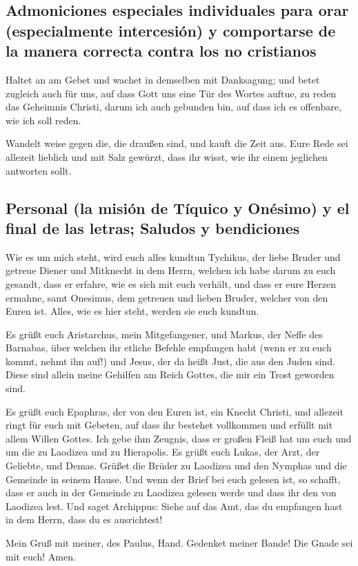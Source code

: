 \hypertarget{admoniciones-especiales-individuales-para-orar-especialmente-intercesiuxf3n-y-comportarse-de-la-manera-correcta-contra-los-no-cristianos}{%
\subsection{Admoniciones especiales individuales para orar
(especialmente intercesión) y comportarse de la manera correcta contra
los no
cristianos}\label{admoniciones-especiales-individuales-para-orar-especialmente-intercesiuxf3n-y-comportarse-de-la-manera-correcta-contra-los-no-cristianos}}

 Haltet an am Gebet und wachet in demselben mit
Danksagung;  und betet zugleich auch für uns, auf dass
Gott uns eine Tür des Wortes auftue, zu reden das Geheimnis Christi,
darum ich auch gebunden bin,  auf dass ich es offenbare,
wie ich soll reden.

 Wandelt weise gegen die, die draußen sind, und kauft die
Zeit aus.  Eure Rede sei allezeit lieblich und mit Salz
gewürzt, dass ihr wisst, wie ihr einem jeglichen antworten sollt.

\hypertarget{personal-la-misiuxf3n-de-tuxedquico-y-onuxe9simo-y-el-final-de-las-letras-saludos-y-bendiciones}{%
\subsection{Personal (la misión de Tíquico y Onésimo) y el final de las
letras; Saludos y
bendiciones}\label{personal-la-misiuxf3n-de-tuxedquico-y-onuxe9simo-y-el-final-de-las-letras-saludos-y-bendiciones}}

 Wie es um mich steht, wird euch alles kundtun Tychikus,
der liebe Bruder und getreue Diener und Mitknecht in dem Herrn,
 welchen ich habe darum zu euch gesandt, dass er erfahre,
wie es sich mit euch verhält, und dass er eure Herzen ermahne,
 samt Onesimus, dem getreuen und lieben Bruder, welcher
von den Euren ist. Alles, wie es hier steht, werden sie euch kundtun.

 Es grüßt euch Aristarchus, mein Mitgefangener, und
Markus, der Neffe des Barnabas, über welchen ihr etliche Befehle
empfangen habt (wenn er zu euch kommt, nehmt ihn auf!) 
und Jesus, der da heißt Just, die aus den Juden sind. Diese sind allein
meine Gehilfen am Reich Gottes, die mir ein Trost geworden sind.

 Es grüßt euch Epaphras, der von den Euren ist, ein
Knecht Christi, und allezeit ringt für euch mit Gebeten, auf dass ihr
bestehet vollkommen und erfüllt mit allem Willen Gottes. 
Ich gebe ihm Zeugnis, dass er großen Fleiß hat um euch und um die zu
Laodizea und zu Hierapolis.  Es grüßt euch Lukas, der
Arzt, der Geliebte, und Demas.  Grüßet die Brüder zu
Laodizea und den Nymphas und die Gemeinde in seinem Hause.
 Und wenn der Brief bei euch gelesen ist, so schafft,
dass er auch in der Gemeinde zu Laodizea gelesen werde und dass ihr den
von Laodizea lest.  Und saget Archippus: Siehe auf das
Amt, das du empfangen hast in dem Herrn, dass du es ausrichtest!

 Mein Gruß mit meiner, des Paulus, Hand. Gedenket meiner
Bande! Die Gnade sei mit euch! Amen.
